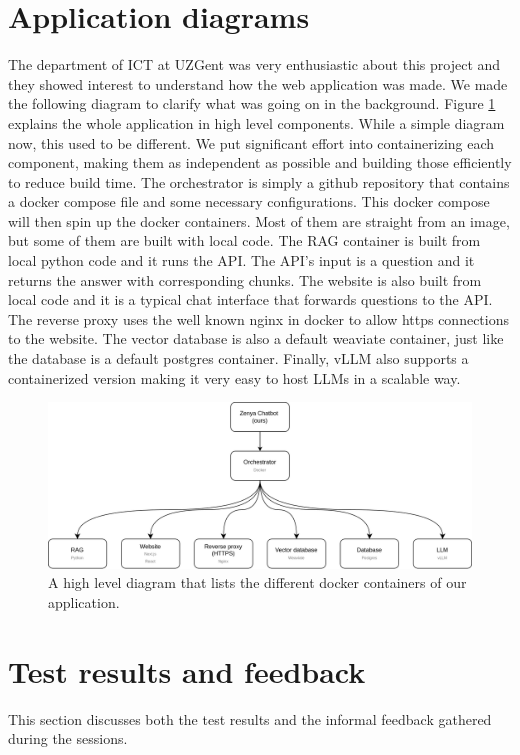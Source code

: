 \section{Application diagrams}
The department of ICT at UZGent was very enthusiastic about this project and they showed interest to understand how the web application was made. We made the following diagram to clarify what was going on in the background. Figure \ref{fig:architecture_docker} explains the whole application in high level components. While a simple diagram now, this used to be different. We put significant effort into containerizing each component, making them as independent as possible and building those efficiently to reduce build time. The orchestrator is simply a github repository that contains a docker compose file and some necessary configurations. This docker compose will then spin up the docker containers. Most of them are straight from an image, but some of them are built with local code. The RAG container is built from local python code and it runs the API. The API's input is a question and it returns the answer with corresponding chunks. The website is also built from local code and it is a typical chat interface that forwards questions to the API. The reverse proxy uses the well known nginx in docker to allow https connections to the website. The vector database is also a default weaviate container, just like the database is a default postgres container. Finally, vLLM also supports a containerized version making it very easy to host LLMs in a scalable way.

\begin{figure}[H]
    \captionsetup{justification=centering}
    \centerline{\includegraphics[width=1\linewidth]{fig/Architecture Docker.png}}
    \caption{A high level diagram that lists the different docker containers of our application.}
    \label{fig:architecture_docker}
\end{figure}

\section{Test results and feedback}
This section discusses both the test results and the informal feedback gathered during the sessions.

